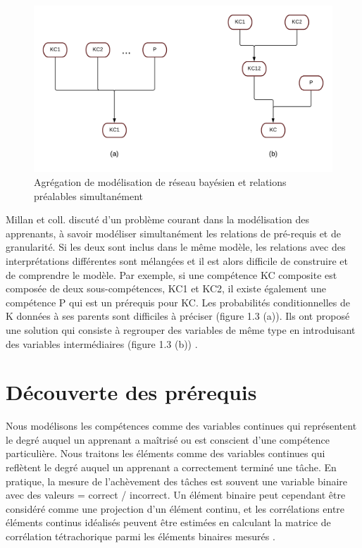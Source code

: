 \begin{figure}[H]
	\begin{center}
		\includegraphics[width=\textwidth]{images/chapitre2/aggregationModelisation.png}
	\end{center}
\caption{Agrégation de modélisation de réseau bayésien et relations préalables simultanément}
\label{agregationModelisation}
\end{figure}

Millan et coll. discuté d'un problème courant dans la modélisation des apprenants, à savoir modéliser simultanément les relations de pré-requis et de granularité. Si les deux sont inclus dans le même modèle, les relations avec des interprétations différentes sont mélangées et il est alors difficile de construire et de comprendre le modèle. Par exemple, si une compétence KC composite est composée de deux sous-compétences, KC1 et KC2, il existe également une compétence P qui est un prérequis pour KC. Les probabilités conditionnelles de K données à ses parents sont difficiles à préciser (figure 1.3 (a)). Ils ont proposé une solution qui consiste à regrouper des variables de même type en introduisant des variables intermédiaires (figure 1.3 (b)) \cite{bayesian_networks_student_model_engineering}.

\section{Découverte des prérequis}
Nous modélisons les compétences comme des variables continues qui représentent le degré auquel un apprenant a maîtrisé ou est conscient d'une compétence particulière. Nous traitons les éléments comme des variables continues qui reflètent le degré auquel un apprenant a correctement terminé une tâche. En pratique, la mesure de l'achèvement des tâches est souvent une variable binaire avec des valeurs = correct / incorrect. Un élément binaire peut cependant être considéré comme une projection d'un élément continu, et les corrélations entre éléments continus idéalisés peuvent être estimées en calculant la matrice de corrélation tétrachorique parmi les éléments binaires mesurés \cite{Discovering_Prerequisite_Relationships_among_Knowledge_Components}.


